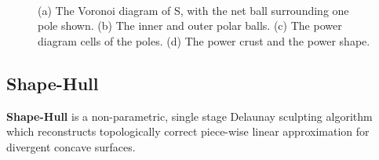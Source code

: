 \documentclass[preprint,5p,times,twocolumn]{elsarticle}
\begin{document}
\begin{itemize}
\begin{figure}[!h]
{	}\\
	\caption{
		\label{teaser_fig}(a) The Voronoi diagram of S, with the net ball surrounding one pole shown. (b) The inner and outer polar balls. (c) The power diagram cells of the poles. (d) The power crust and the power shape.
	}
\end{figure}
\end{itemize}

\subsection{Shape-Hull}
\textbf{Shape-Hull}\cite{Peethambaran:2015:RWS:2941001.2941130} is a non-parametric, single stage Delaunay sculpting algorithm which reconstructs topologically correct piece-wise linear approximation for divergent concave surfaces.
\end{document}
